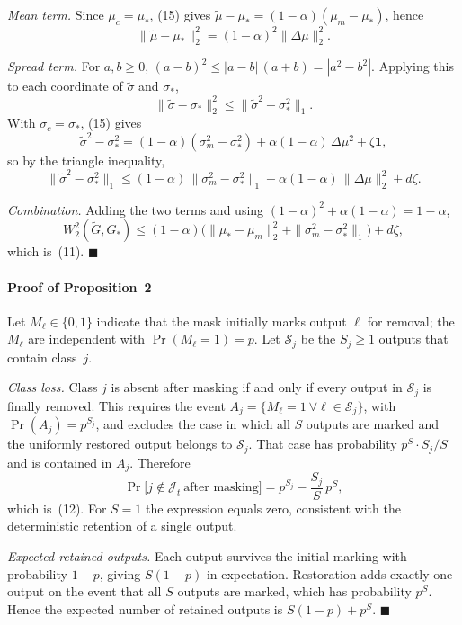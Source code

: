 \emph{Mean term.} Since $\mu_c = \mu_*$, (15) gives
$\tilde\mu - \mu_* = (1-\alpha)(\mu_m - \mu_*)$, hence
\begin{equation*}
\|\tilde\mu - \mu_*\|_2^2 = (1-\alpha)^2\|\Delta\mu\|_2^2 .
\end{equation*}

\emph{Spread term.} For $a, b \ge 0$,
$(a-b)^2 \le |a-b|\,(a+b) = |a^2 - b^2|$. Applying this to each coordinate of
$\tilde\sigma$ and $\sigma_*$,
\begin{equation*}
\|\tilde\sigma - \sigma_*\|_2^2 \le \bigl\|\tilde\sigma^2 - \sigma_*^2\bigr\|_1 .
\end{equation*}
With $\sigma_c = \sigma_*$, (15) gives
\begin{equation*}
\tilde\sigma^2 - \sigma_*^2
= (1-\alpha)(\sigma_m^2 - \sigma_*^2) + \alpha(1-\alpha)\,\Delta\mu^2 + \zeta\mathbf{1},
\end{equation*}
so by the triangle inequality,
\begin{equation*}
\bigl\|\tilde\sigma^2 - \sigma_*^2\bigr\|_1
\le (1-\alpha)\,\|\sigma_m^2 - \sigma_*^2\|_1 + \alpha(1-\alpha)\,\|\Delta\mu\|_2^2 + d\zeta .
\end{equation*}

\emph{Combination.} Adding the two terms and using
$(1-\alpha)^2 + \alpha(1-\alpha) = 1-\alpha$,
\begin{equation*}
W_2^2(\widetilde{G}, G_*) \le (1-\alpha)\bigl(\|\mu_* - \mu_m\|_2^2 + \|\sigma_m^2 - \sigma_*^2\|_1\bigr) + d\zeta,
\end{equation*}
which is~(11). \hfill$\blacksquare$

\paragraph*{Proof of Proposition~2}
Let $M_\ell \in \{0,1\}$ indicate that the mask initially marks output $\ell$
for removal; the $M_\ell$ are independent with $\Pr(M_\ell = 1) = p$. Let
$\mathcal{S}_j$ be the $S_j \ge 1$ outputs that contain class~$j$.

\emph{Class loss.} Class $j$ is absent after masking if and only if every
output in $\mathcal{S}_j$ is finally removed. This requires the event
$A_j = \{M_\ell = 1\ \forall \ell \in \mathcal{S}_j\}$, with
$\Pr(A_j) = p^{S_j}$, and excludes the case in which all $S$ outputs are
marked and the uniformly restored output belongs to $\mathcal{S}_j$. That case
has probability $p^{S}\cdot S_j/S$ and is contained in $A_j$. Therefore
\begin{equation*}
\Pr\bigl[j \notin \mathcal{J}_t\ \text{after masking}\bigr] = p^{S_j} - \frac{S_j}{S}\,p^{S},
\end{equation*}
which is~(12). For $S = 1$ the expression equals zero, consistent with the
deterministic retention of a single output.

\emph{Expected retained outputs.} Each output survives the initial marking
with probability $1-p$, giving $S(1-p)$ in expectation. Restoration adds
exactly one output on the event that all $S$ outputs are marked, which has
probability $p^S$. Hence the expected number of retained outputs is
$S(1-p) + p^S$. \hfill$\blacksquare$

